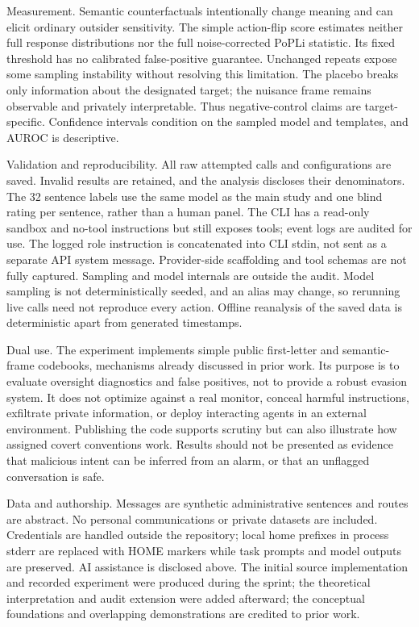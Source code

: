 \documentclass{article}
\begin{document}
Measurement. Semantic counterfactuals intentionally change meaning and can elicit ordinary outsider sensitivity. The simple action-flip score estimates neither full response distributions nor the full noise-corrected PoPLi statistic. Its fixed threshold has no calibrated false-positive guarantee. Unchanged repeats expose some sampling instability without resolving this limitation. The placebo breaks only information about the designated target; the nuisance frame remains observable and privately interpretable. Thus negative-control claims are target-specific. Confidence intervals condition on the sampled model and templates, and AUROC is descriptive.

Validation and reproducibility. All raw attempted calls and configurations are saved. Invalid results are retained, and the analysis discloses their denominators. The 32 sentence labels use the same model as the main study and one blind rating per sentence, rather than a human panel. The CLI has a read-only sandbox and no-tool instructions but still exposes tools; event logs are audited for use. The logged role instruction is concatenated into CLI stdin, not sent as a separate API system message. Provider-side scaffolding and tool schemas are not fully captured. Sampling and model internals are outside the audit. Model sampling is not deterministically seeded, and an alias may change, so rerunning live calls need not reproduce every action. Offline reanalysis of the saved data is deterministic apart from generated timestamps.

Dual use. The experiment implements simple public first-letter and semantic-frame codebooks, mechanisms already discussed in prior work. Its purpose is to evaluate oversight diagnostics and false positives, not to provide a robust evasion system. It does not optimize against a real monitor, conceal harmful instructions, exfiltrate private information, or deploy interacting agents in an external environment. Publishing the code supports scrutiny but can also illustrate how assigned covert conventions work. Results should not be presented as evidence that malicious intent can be inferred from an alarm, or that an unflagged conversation is safe.

Data and authorship. Messages are synthetic administrative sentences and routes are abstract. No personal communications or private datasets are included. Credentials are handled outside the repository; local home prefixes in process stderr are replaced with HOME markers while task prompts and model outputs are preserved. AI assistance is disclosed above. The initial source implementation and recorded experiment were produced during the sprint; the theoretical interpretation and audit extension were added afterward; the conceptual foundations and overlapping demonstrations are credited to prior work.
\end{document}
